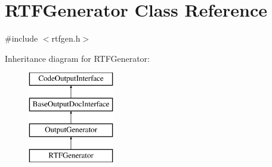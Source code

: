 \hypertarget{class_r_t_f_generator}{}\section{R\+T\+F\+Generator Class Reference}
\label{class_r_t_f_generator}


{\ttfamily \#include $<$rtfgen.\+h$>$}

Inheritance diagram for R\+T\+F\+Generator\+:\begin{figure}[H]
\begin{center}
\leavevmode
\includegraphics[height=4.000000cm]{class_r_t_f_generator}
\end{center}
\end{figure}
